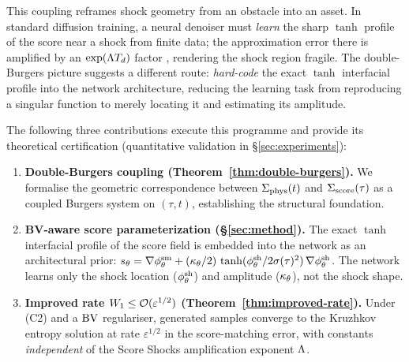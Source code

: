 This coupling reframes shock geometry from an obstacle into an asset. In standard diffusion training, a neural denoiser must \emph{learn} the sharp $\tanh$ profile of the score near a shock from finite data; the approximation error there is amplified by an $\exp(\Lambda T_{d})$ factor \citep[Theorem~6.3]{sarkar2026scoreshocks}, rendering the shock region fragile. The double-Burgers picture suggests a different route: \emph{hard-code} the exact $\tanh$ interfacial profile into the network architecture, reducing the learning task from reproducing a singular function to merely locating it and estimating its amplitude.

The following three contributions execute this programme and provide its theoretical certification (quantitative validation in \S\ref{sec:experiments}):

\begin{enumerate}[label=(\textbf{C\arabic*}), leftmargin=*, itemsep=2pt]
    \item \textbf{Double-Burgers coupling (Theorem~\ref{thm:double-burgers}).} We formalise the geometric correspondence between $\Sigma_{\mathrm{phys}}(t)$ and $\Sigma_{\mathrm{score}}(\tau)$ as a coupled Burgers system on $(\tau, t)$, establishing the structural foundation.
    \item \textbf{BV-aware score parameterization (\S\ref{sec:method}).} The exact $\tanh$ interfacial profile of the score field \citep[Prop.~5.4]{sarkar2026scoreshocks} is embedded into the network as an architectural prior: $s_{\theta} = \nabla\phi^{\mathrm{sm}}_{\theta} + (\kappa_{\theta}/2)\,\tanh(\phi^{\mathrm{sh}}_{\theta}/2\sigma(\tau)^{2})\,\nabla\phi^{\mathrm{sh}}_{\theta}$. The network learns only the shock location ($\phi^{\mathrm{sh}}_{\theta}$) and amplitude ($\kappa_{\theta}$), not the shock shape.
    \item \textbf{Improved rate $W_{1} \le \mathcal{O}(\varepsilon^{1/2})$ (Theorem~\ref{thm:improved-rate}).} Under (C2) and a $\mathrm{BV}$ regulariser, generated samples converge to the Kruzhkov entropy solution at rate $\varepsilon^{1/2}$ in the score-matching error, with constants \emph{independent} of the Score Shocks amplification exponent $\Lambda$.
\end{enumerate}
